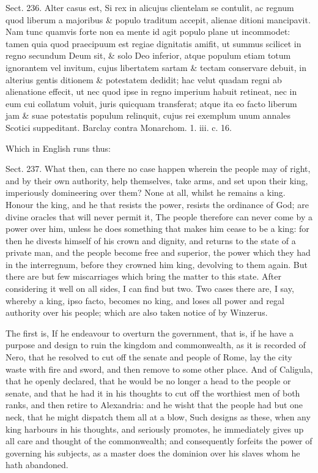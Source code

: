\documentclass[11pt,openany]{book}
\begin{document}
Sect. 236. Alter casus est, Si rex in alicujus clientelam se contulit, ac regnum quod liberum a majoribus \& populo traditum accepit, alienae ditioni mancipavit. Nam tunc quamvis forte non ea mente id agit populo plane ut incommodet: tamen quia quod praecipuum est regiae dignitatis amifit, ut summus scilicet in regno secundum Deum sit, \& solo Deo inferior, atque populum etiam totum ignorantem vel invitum, cujus libertatem sartam \& tectam conservare debuit, in alterius gentis ditionem \& potestatem dedidit; hac velut quadam regni ab alienatione effecit, ut nec quod ipse in regno imperium habuit retineat, nec in eum cui collatum voluit, juris quicquam transferat; atque ita eo facto liberum jam \& suae potestatis populum relinquit, cujus rei exemplum unum annales Scotici suppeditant. Barclay contra Monarchom. 1. iii. c. 16.

Which in English runs thus:

Sect. 237. What then, can there no case happen wherein the people may of right, and by their own authority, help themselves, take arms, and set upon their king, imperiously domineering over them? None at all, whilst he remains a king. Honour the king, and he that resists the power, resists the ordinance of God; are divine oracles that will never permit it, The people therefore can never come by a power over him, unless he does something that makes him cease to be a king: for then he divests himself of his crown and dignity, and returns to the state of a private man, and the people become free and superior, the power which they had in the interregnum, before they crowned him king, devolving to them again. But there are but few miscarriages which bring the matter to this state. After considering it well on all sides, I can find but two. Two cases there are, I say, whereby a king, ipso facto, becomes no king, and loses all power and regal authority over his people; which are also taken notice of by Winzerus.

The first is, If he endeavour to overturn the government, that is, if he have a purpose and design to ruin the kingdom and commonwealth, as it is recorded of Nero, that he resolved to cut off the senate and people of Rome, lay the city waste with fire and sword, and then remove to some other place. And of Caligula, that he openly declared, that he would be no longer a head to the people or senate, and that he had it in his thoughts to cut off the worthiest men of both ranks, and then retire to Alexandria: and he wisht that the people had but one neck, that he might dispatch them all at a blow, Such designs as these, when any king harbours in his thoughts, and seriously promotes, he immediately gives up all care and thought of the commonwealth; and consequently forfeits the power of governing his subjects, as a master does the dominion over his slaves whom he hath abandoned.
\end{document}
